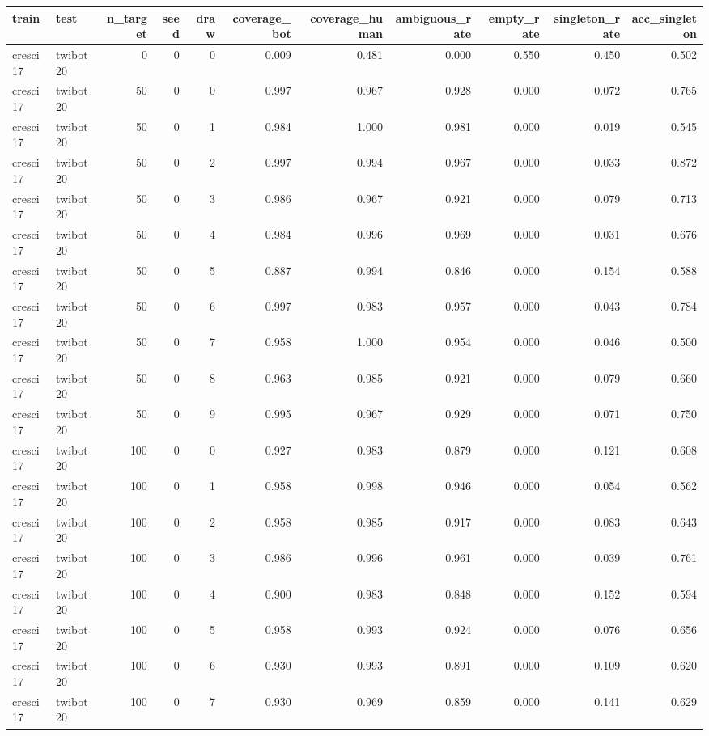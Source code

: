 \begin{tabular}{llrrrrrrrrr}
\toprule
train & test & n_target & seed & draw & coverage_bot & coverage_human & ambiguous_rate & empty_rate & singleton_rate & acc_singleton \\
\midrule
cresci17 & twibot20 & 0 & 0 & 0 & 0.009 & 0.481 & 0.000 & 0.550 & 0.450 & 0.502 \\
cresci17 & twibot20 & 50 & 0 & 0 & 0.997 & 0.967 & 0.928 & 0.000 & 0.072 & 0.765 \\
cresci17 & twibot20 & 50 & 0 & 1 & 0.984 & 1.000 & 0.981 & 0.000 & 0.019 & 0.545 \\
cresci17 & twibot20 & 50 & 0 & 2 & 0.997 & 0.994 & 0.967 & 0.000 & 0.033 & 0.872 \\
cresci17 & twibot20 & 50 & 0 & 3 & 0.986 & 0.967 & 0.921 & 0.000 & 0.079 & 0.713 \\
cresci17 & twibot20 & 50 & 0 & 4 & 0.984 & 0.996 & 0.969 & 0.000 & 0.031 & 0.676 \\
cresci17 & twibot20 & 50 & 0 & 5 & 0.887 & 0.994 & 0.846 & 0.000 & 0.154 & 0.588 \\
cresci17 & twibot20 & 50 & 0 & 6 & 0.997 & 0.983 & 0.957 & 0.000 & 0.043 & 0.784 \\
cresci17 & twibot20 & 50 & 0 & 7 & 0.958 & 1.000 & 0.954 & 0.000 & 0.046 & 0.500 \\
cresci17 & twibot20 & 50 & 0 & 8 & 0.963 & 0.985 & 0.921 & 0.000 & 0.079 & 0.660 \\
cresci17 & twibot20 & 50 & 0 & 9 & 0.995 & 0.967 & 0.929 & 0.000 & 0.071 & 0.750 \\
cresci17 & twibot20 & 100 & 0 & 0 & 0.927 & 0.983 & 0.879 & 0.000 & 0.121 & 0.608 \\
cresci17 & twibot20 & 100 & 0 & 1 & 0.958 & 0.998 & 0.946 & 0.000 & 0.054 & 0.562 \\
cresci17 & twibot20 & 100 & 0 & 2 & 0.958 & 0.985 & 0.917 & 0.000 & 0.083 & 0.643 \\
cresci17 & twibot20 & 100 & 0 & 3 & 0.986 & 0.996 & 0.961 & 0.000 & 0.039 & 0.761 \\
cresci17 & twibot20 & 100 & 0 & 4 & 0.900 & 0.983 & 0.848 & 0.000 & 0.152 & 0.594 \\
cresci17 & twibot20 & 100 & 0 & 5 & 0.958 & 0.993 & 0.924 & 0.000 & 0.076 & 0.656 \\
cresci17 & twibot20 & 100 & 0 & 6 & 0.930 & 0.993 & 0.891 & 0.000 & 0.109 & 0.620 \\
cresci17 & twibot20 & 100 & 0 & 7 & 0.930 & 0.969 & 0.859 & 0.000 & 0.141 & 0.629 \\

\end{tabular}
